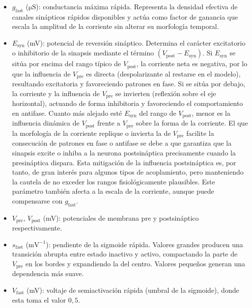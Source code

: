 \begin{itemize}
    \item \(g_{\mathrm{fast}}\) (\(\mathrm{\mu S}\)): conductancia máxima rápida. Representa la densidad efectiva de canales sinápticos rápidos disponibles y actúa como factor de ganancia que escala la amplitud de la corriente sin alterar su morfología temporal.
    \item \(E_{\mathrm{syn}}\) (mV): potencial de reversión sináptico. Determina el carácter excitatorio o inhibitorio de la sinapsis mediante el término \((V_{\mathrm{post}} - E_{\mathrm{syn}})\). Si \(E_{\mathrm{syn}}\) se sitúa por encima del rango típico de \(V_{\mathrm{post}}\), la corriente neta es negativa, por lo que la influencia de \(V_{\mathrm{pre}}\) es directa (despolarizante al restarse en el modelo), resultando excitatoria y favoreciendo patrones en fase. Si se sitúa por debajo, la corriente y la influencia de \(V_{\mathrm{pre}}\) se invierten (reflexión sobre el eje horizontal), actuando de forma inhibitoria y favoreciendo el comportamiento en antifase. Cuanto más alejado esté \(E_{\mathrm{syn}}\) del rango de \(V_{\mathrm{post}}\), menor es la influencia dinámica de \(V_{\mathrm{post}}\) frente a \(V_{\mathrm{pre}}\) sobre la forma de la corriente. El que la morfología de la corriente replique o invierta la de \(V_{\mathrm{pre}}\) facilite la consecución de patrones en fase o antifase se debe a que garantiza que la sinapsis excite o inhiba a la neurona postsináptica precisamente cuando la presináptica dispara. Esta mitigación de la influencia postsináptica es, por tanto, de gran interés para algunos tipos de acoplamiento, pero manteniendo la cautela de no exceder los rangos fisiológicamente plausibles. Este parámetro también afecta a la escala de la corriente, aunque puede compensarse con \(g_{\mathrm{fast}}\).
    \item \(V_{\mathrm{pre}}\), \(V_{\mathrm{post}}\) (mV): potenciales de membrana pre y postsináptico respectivamente.
    \item \(s_{\mathrm{fast}}\) (\(\mathrm{mV}^{-1}\)): pendiente de la sigmoide rápida. Valores grandes producen una transición abrupta entre estado inactivo y activo, compactando la parte de \(V_{\mathrm{pre}}\) en los bordes y expandiendo la del centro. Valores pequeños generan una dependencia más suave.
    \item \(V_{\mathrm{fast}}\) (mV): voltaje de semiactivación rápida (umbral de la sigmoide), donde esta toma el valor $0{,}5$.
\end{itemize}

